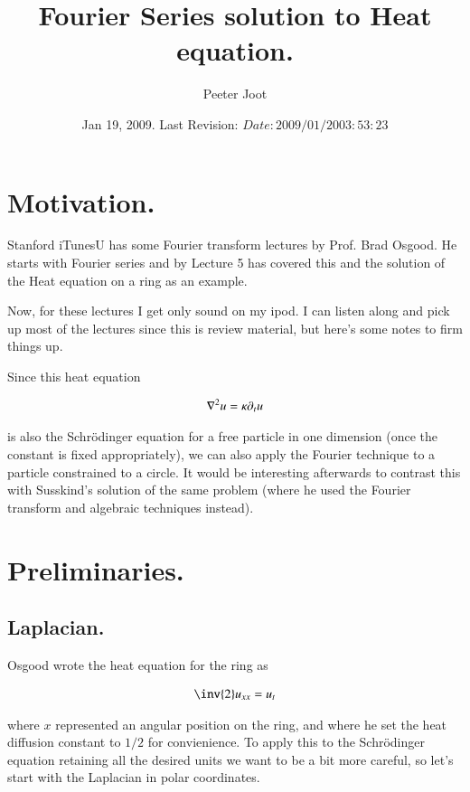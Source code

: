 \documentclass{article}
\title{ Fourier Series solution to Heat equation. }
\author{Peeter Joot}
\date{ Jan 19, 2009.  Last Revision: $Date: 2009/01/20 03:53:23 $ }
\begin{document}
\maketitle{}


\section{ Motivation. }

Stanford iTunesU has some Fourier transform lectures by Prof. Brad Osgood.
He starts with Fourier series and by Lecture 5 has covered this and
the solution of the Heat equation on a ring as an example.

Now, for these lectures I get only sound on my ipod.  I can listen along and
pick up most of the lectures since this is review material, but here's some
notes to firm things up.

Since this heat equation

\begin{align}
\nabla^2 u = \kappa \partial_t u
\end{align}

is also the Schr\"{o}dinger equation for a free particle in one 
dimension (once the 
constant is fixed appropriately), we can also apply the Fourier
technique to a particle
constrained to a circle.  It would be interesting afterwards to 
contrast this with Susskind's solution of the
same problem (where he used the Fourier transform and algebraic techniques
instead).

\section{ Preliminaries. }

\subsection{ Laplacian. }

Osgood wrote the heat equation for the ring as

\begin{align*}
\inv{2} u_{xx} = u_t
\end{align*}

where $x$ represented an angular position on the ring, and where
he set the heat diffusion constant to $1/2$ for convienience.
To apply this to the Schr\"{o}dinger equation retaining all the desired
units we want to be a bit more careful, so let's start with the Laplacian
in polar coordinates.
\end{document}
